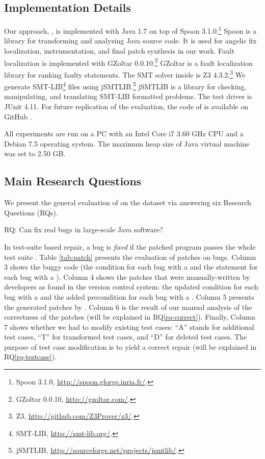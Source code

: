 \subsection{Implementation Details}
\label{subsect:impl}

Our approach, \nopol, is implemented with Java 1.7 on top of Spoon 3.1.0.\footnote{Spoon 3.1.0, \url{http://spoon.gforge.inria.fr/}.} Spoon \cite{pawlak2015spoon} is a library for transforming and analyzing Java source code. It is used for angelic fix localization, instrumentation, and final patch synthesis in our work. Fault localization is implemented with GZoltar 0.0.10.\footnote{GZoltar 0.0.10, \url{http://gzoltar.com/}.} GZoltar \cite{CamposRPA12} is a fault localization library for ranking faulty statements. The SMT solver inside \nopol is Z3 4.3.2.\footnote{Z3, \url{http://github.com/Z3Prover/z3/}.} We generate SMT-LIB\footnote{SMT-LIB, \url{http://smt-lib.org/}.} files using jSMTLIB.\footnote{jSMTLIB, \url{http://sourceforge.net/projects/jsmtlib/}.} jSMTLIB \cite{cok2011jsmtlib} is a library for checking, manipulating, and translating SMT-LIB formatted problems. The test driver is JUnit 4.11. For future replication of the evaluation, the code of \nopol is available on GitHub \cite{nopolcode2014}. 

All experiments are run on a PC with an Intel Core i7 3.60 GHz CPU and a Debian 7.5 operating system. The maximum heap size of Java virtual machine was set to 2.50 GB. 

\subsection{Main Research Questions}
\label{subsect:general-repair}

We present the general evaluation of \nopol on the dataset via answering six Research Questions (RQs). 

\medskip
\begin{mdframed}
RQ\label{rq-fix}: Can \nopol fix real bugs in large-scale Java software?
\end{mdframed}

In test-suite based repair, a bug is \textit{fixed} if the patched program passes the whole test suite \cite{le2012genprog}. 
Table \ref{tab:patch} presents the evaluation of patches on \numbug bugs. 
Column 3 shows the buggy code (the condition for each bug with a \buggycondition and the statement for each bug with a \precondition).
Column 4 shows the patches that were manually-written by developers as found in the version control system: the updated condition for each bug with a \buggycondition and the added precondition for each bug with a \precondition. Column 5 presents the generated patches by \nopol. 
Column 6 is the result of our manual analysis of the correctness of the patches (will be explained in RQ\ref{rq-correct}).
Finally, Column 7 shows whether we had to modify existing test cases: ``A'' stands for additional test cases, ``T'' for transformed test cases, and ``D'' for deleted test cases.
The purpose of test case modification is to yield a correct repair (will be explained in RQ\ref{rq-testcase}).

